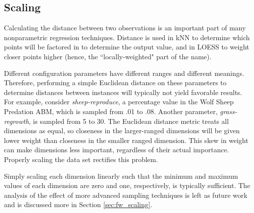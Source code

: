 \subsection{Scaling}

Calculating the distance between two observations is an important part of many nonparametric regression techniques.
Distance is used in kNN to determine which points will  be factored in to determine the output value, and in LOESS to weight closer points higher (hence, the ``locally-weighted" part of the name).

Different configuration parameters have different ranges and different meanings.
Therefore, performing a simple Euclidean distance on these parameters to determine distances between instances will typically not yield favorable results.
For example, consider \textit{sheep-reproduce}, a percentage value in the Wolf Sheep Predation ABM, which is sampled from .01 to .08.
Another parameter, \textit{grass-regrowth}, is sampled from 5 to 30.
The Euclidean distance metric treats all dimensions as equal, so closeness in the larger-ranged dimensions will be given lower weight than closeness in the smaller ranged dimension.
This skew in weight can make dimensions less important, regardless of their actual importance.
Properly scaling the data set rectifies this problem.


Simply scaling each dimension linearly such that the minimum and maximum values of each dimension are zero and one, respectively, is typically sufficient.
The analysis of the effect of more advanced sampling techniques is left as future work and is discussed more in Section \ref{sec:fw_scaling}.


